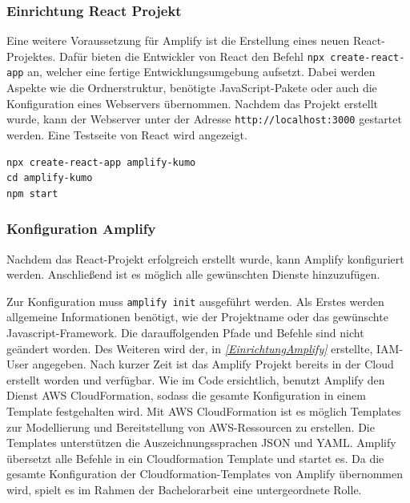 \subsubsection{Einrichtung React Projekt}

Eine weitere Voraussetzung für Amplify ist die Erstellung eines neuen React-Projektes.
Dafür bieten die Entwickler von React den Befehl \verb+npx create-react-app+ an, welcher eine fertige Entwicklungsumgebung aufsetzt.
Dabei werden Aspekte wie die Ordnerstruktur, benötigte JavaScript-Pakete oder auch die Konfiguration eines Webservers übernommen.\cite{ReactNew}
Nachdem das Projekt erstellt wurde, kann der Webserver unter der Adresse \verb+http://localhost:3000+ gestartet werden.
Eine Testseite von React wird angezeigt.
\\
\begin{lstlisting}[basicstyle=\ttfamily\small, breaklines=true , frame = single, backgroundcolor=\color{flashwhite} ]
npx create-react-app amplify-kumo
cd amplify-kumo
npm start
\end{lstlisting}


\subsubsection{Konfiguration Amplify}

Nachdem das React-Projekt erfolgreich erstellt wurde, kann Amplify konfiguriert werden.
Anschließend ist es möglich alle gewünschten Dienste hinzuzufügen.

Zur Konfiguration muss \verb+amplify init+ ausgeführt werden.
Als Erstes werden allgemeine Informationen benötigt, wie der Projektname oder das gewünschte Javascript-Framework.
Die darauffolgenden Pfade und Befehle sind nicht geändert worden.
Des Weiteren wird der, in \textit{\ref{EinrichtungAmplify} } erstellte, IAM-User angegeben.
Nach kurzer Zeit ist das Amplify Projekt bereits in der Cloud erstellt worden und verfügbar.
\clearpage
Wie im Code ersichtlich, benutzt Amplify den Dienst AWS CloudFormation, sodass die gesamte Konfiguration in einem Template festgehalten wird.
Mit AWS CloudFormation ist es möglich Templates zur Modellierung und Bereitstellung von AWS-Ressourcen zu erstellen.
Die Templates unterstützen die Auszeichnungssprachen JSON und YAML.
Amplify übersetzt alle Befehle in ein Cloudformation Template und startet es.
Da die gesamte Konfiguration der Cloudformation-Templates von Amplify übernommen wird, spielt es im Rahmen der Bachelorarbeit eine untergeordnete Rolle.


